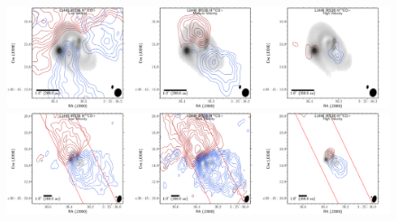 \begin{figure}[H]
\begin{center}
   \includegraphics[width=1\textwidth]{img/L1448IRS3B_H13COp_image_taper400k__binned_panel_matchC17O_400.pdf}  %
   \includegraphics[width=1\textwidth]{img/L1448IRS3B_H13COp_image_taper1000k__binned_panel.pdf}
\end{center}

\end{figure}
